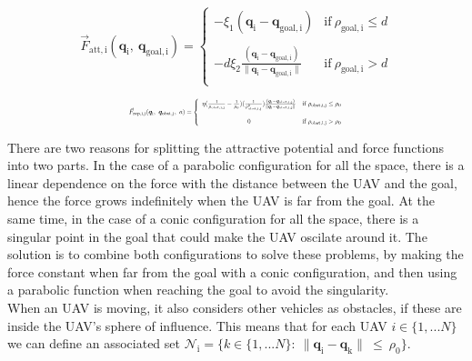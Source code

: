 \documentclass[journal, twoside]{IEEEtran}
\newcommand*{\subb}[1]{_{\mathrm{#1}}}
\begin{document}
		\begin{equation} \label{eq:force_att}
		\vec{F}\subb{att, i}(\bm{q}\subb{i}, \ \bm{q}\subb{goal, i}) =  \left\lbrace  {\begin{array}{cc}
			- \xi\subb{1} (\bm{q}\subb{i}-\bm{q}\subb{goal, i})& \textrm{if} \ \rho\subb{goal, i}\leq d \\
			\\
			-d \xi\subb{2} \frac{(\bm{q}\subb{i}-\bm{q}\subb{goal, i})}{\parallel\bm{q}\subb{i}-\bm{q}\subb{goal,i}\parallel}&\textrm{if} \ \rho\subb{goal, i}> d \\
			\end{array} } \right.
		\end{equation}
		
		\begin{equation} \label{eq:force_rep}	
		\resizebox{0.5\textwidth}{!}{ $
			\vec{F}\subb{rep, i,j}(\bm{q}\subb{i}, \ \bm{q}\subb{obst, j},\ a ) =  \left\lbrace  {\begin{array}{cc}
				\eta (\frac{1}{\rho\subb{obst,i,j}}-\frac{1}{\rho\subb{0}})(\frac{1}{\rho\subb{obst,i,j}^2})\frac{(\bm{q}\subb{i}-\bm{q}\subb{obst,i,j})}{\parallel\bm{q}\subb{i}-\bm{q}\subb{obst,i,j} \parallel} & \textrm{if} \ \rho\subb{obst,i,j}\leq \rho\subb{0} \\
				\\
				0 &\textrm{if} \ \rho\subb{obst,i,j}> \rho\subb{0} \\
				\end{array} } \right. $}
		\end{equation}
		
		There are two reasons for splitting the attractive potential and force functions into two parts. In the case of a parabolic configuration for all the space, there is a linear dependence on the force with the distance between the UAV and the goal, hence the force grows indefinitely when the UAV is far from the goal. At the same time, in the case of a conic configuration for all the space, there is a singular point in the goal that could make the UAV oscilate around it. The solution is to combine both configurations to solve these problems, by making the force constant when far from the goal with a conic configuration, and then using a parabolic function when reaching the goal to avoid the singularity.\\
		
		When an UAV is moving, it also considers other vehicles as obstacles, if these are inside the UAV's sphere of influence. This means that for each UAV $i \in \{1,...N\}$ we can define an associated set $\mathcal{N}\subb{i} = \{ k \in \{1,...N\} : \ \parallel \bm{q}\subb{i} - \bm{q}\subb{k} \parallel \ \leq \ \rho\subb{0}\}$. \\
		
\end{document}
